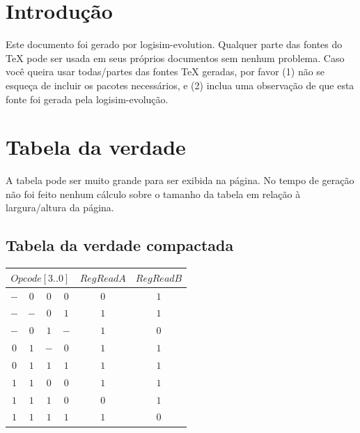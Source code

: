 \documentclass [15pt,a4paper,twoside]{article}
\begin{document}
\section{Introdução}
Este documento foi gerado por logisim-evolution. Qualquer parte das fontes do TeX pode ser usada em seus próprios documentos sem nenhum problema. Caso você queira usar todas/partes das fontes TeX geradas, por favor (1) não se esqueça de incluir os pacotes necessários, e (2) inclua uma observação de que esta fonte foi gerada pela logisim-evolução.
\section{Tabela da verdade}
A tabela pode ser muito grande para ser exibida na página. No tempo de geração não foi feito nenhum cálculo sobre o tamanho da tabela em relação à largura/altura da página.
\subsection{Tabela da verdade compactada}
\begin{center}
\begin{tabular}{cccc|cc}
\multicolumn{4}{c|}{$Opcode[3..0]$}&$RegReadA$&$RegReadB$\\
\hline
$-$&$0$&$0$&$0$&$0$&$1$\\
$-$&$-$&$0$&$1$&$1$&$1$\\
$-$&$0$&$1$&$-$&$1$&$0$\\
$0$&$1$&$-$&$0$&$1$&$1$\\
$0$&$1$&$1$&$1$&$1$&$1$\\
$1$&$1$&$0$&$0$&$1$&$1$\\
$1$&$1$&$1$&$0$&$0$&$1$\\
$1$&$1$&$1$&$1$&$1$&$0$\\

\end{tabular}
\end{center}
\end{document}
